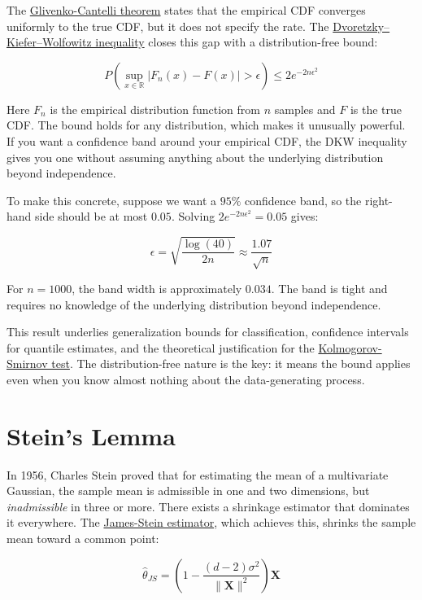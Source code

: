 \documentclass[11pt]{article}
\begin{document}
The \href{https://en.wikipedia.org/wiki/Glivenko\%E2\%80\%93Cantelli_theorem}{Glivenko-Cantelli theorem} states that the empirical CDF converges uniformly to the true CDF, but it does not specify the rate. The \href{https://en.wikipedia.org/wiki/Dvoretzky\%E2\%80\%93Kiefer\%E2\%80\%93Wolfowitz_inequality}{Dvoretzky--Kiefer--Wolfowitz inequality} closes this gap with a distribution-free bound:

\[P\left(\sup_{x \in \mathbb{R}} |F_n(x) - F(x)| > \epsilon\right) \leq 2e^{-2n\epsilon^2}\]

Here \(F_n\) is the empirical distribution function from \(n\) samples and \(F\) is the true CDF. The bound holds for any distribution, which makes it unusually powerful. If you want a confidence band around your empirical CDF, the DKW inequality gives you one without assuming anything about the underlying distribution beyond independence.

To make this concrete, suppose we want a \(95\%\) confidence band, so the right-hand side should be at most \(0.05\). Solving \(2e^{-2n\epsilon^2} = 0.05\) gives:

\[\epsilon = \sqrt{\frac{\log(40)}{2n}} \approx \frac{1.07}{\sqrt{n}}\]

For \(n = 1000\), the band width is approximately \(0.034\). The band is tight and requires no knowledge of the underlying distribution beyond independence.

This result underlies generalization bounds for classification, confidence intervals for quantile estimates, and the theoretical justification for the \href{https://en.wikipedia.org/wiki/Kolmogorov\%E2\%80\%93Smirnov_test}{Kolmogorov-Smirnov test}. The distribution-free nature is the key: it means the bound applies even when you know almost nothing about the data-generating process.

\section{Stein's Lemma}\label{steins-lemma}

In 1956, Charles Stein proved that for estimating the mean of a multivariate Gaussian, the sample mean is admissible in one and two dimensions, but \emph{inadmissible} in three or more. There exists a shrinkage estimator that dominates it everywhere. The \href{https://en.wikipedia.org/wiki/James\%E2\%80\%93Stein_estimator}{James-Stein estimator}, which achieves this, shrinks the sample mean toward a common point:

\[\hat{\theta}_{JS} = \left(1 - \frac{(d-2)\sigma^2}{\|\mathbf{X}\|^2}\right) \mathbf{X}\]
\end{document}
